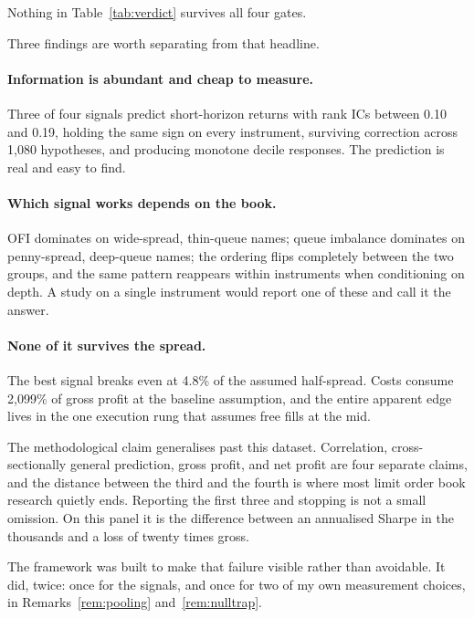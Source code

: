 \documentclass[11pt]{scrartcl}
\begin{document}
Nothing in Table~\ref{tab:verdict} survives all four gates.

Three findings are worth separating from that headline.

\paragraph{Information is abundant and cheap to measure.} Three of four signals predict short-horizon returns with rank ICs between 0.10 and 0.19, holding the same sign on every instrument, surviving correction across 1{,}080 hypotheses, and producing monotone decile responses. The prediction is real and easy to find.

\paragraph{Which signal works depends on the book.} OFI dominates on wide-spread, thin-queue names; queue imbalance dominates on penny-spread, deep-queue names; the ordering flips completely between the two groups, and the same pattern reappears within instruments when conditioning on depth. A study on a single instrument would report one of these and call it the answer.

\paragraph{None of it survives the spread.} The best signal breaks even at 4.8\% of the assumed half-spread. Costs consume 2{,}099\% of gross profit at the baseline assumption, and the entire apparent edge lives in the one execution rung that assumes free fills at the mid.

The methodological claim generalises past this dataset. Correlation, cross-sectionally general prediction, gross profit, and net profit are four separate claims, and the distance between the third and the fourth is where most limit order book research quietly ends. Reporting the first three and stopping is not a small omission. On this panel it is the difference between an annualised Sharpe in the thousands and a loss of twenty times gross.

The framework was built to make that failure visible rather than avoidable. It did, twice: once for the signals, and once for two of my own measurement choices, in Remarks~\ref{rem:pooling} and~\ref{rem:nulltrap}.

\appendix
\newpage
\end{document}
